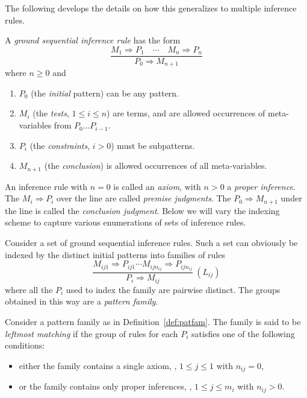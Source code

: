 \documentclass[11pt]{article} %
\begin{document}
The following develops the details on how this generalizes to multiple inference rules.

\begin{definition}
  A \HAX \emph{ground sequential inference rule} has the form
  \begin{equation}
    \dfrac{ M_1 ⇒ P_1 \quad\cdots\quad M_n ⇒ P_n }{ P_0 ⇒ M_{n+1} }
  \end{equation}
  where $n≥0$ and
  \begin{enumerate}
  \item $P_0$ (the \emph{initial} pattern) can be any \HAX pattern.
  \item $M_i$ (the \emph{tests}, $1≤i≤n$) are \HAX terms, and are allowed occurrences of
    meta-variables from $P_0…P_{i-1}$.
  \item $P_i$ (the \emph{constraints}, $i>0$) must be \HAX subpatterns.
  \item $M_{n+1}$ (the \emph{conclusion}) is allowed occurrences of all meta-variables.
  \end{enumerate}
  An inference rule with $n=0$ is called an \emph{axiom}, with $n>0$ a \emph{proper inference}.
  The $M_i⇒P_i$ over the line are called \emph{premise judgments}. The $P_0⇒M_{n+1}$ under the line
  is called the \emph{conclusion judgment}.
  Below we will vary the indexing scheme to capture various enumerations of sets of inference rules.
\end{definition}

\begin{definition}\label{def:patfam}
  Consider a set of ground sequential inference rules.  Such a set can obviously be indexed by the
  distinct initial patterns into families of rules
  \begin{displaymath}
    \dfrac{ M_{ij1} ⇒ P_{ij1} \cdots M_{ijn_{ij}} ⇒ P_{ijn_{ij}} }{ P_i ⇒ M_{ij} } ~(L_{ij})
  \end{displaymath}
  where all the $P_i$ used to index the family are pairwise distinct.  The groups obtained in this
  way are a \emph{pattern family}.
\end{definition}

\begin{definition}
  Consider a pattern family as in Definition~\ref{def:patfam}.  The family is said to be
  \emph{leftmost matching} if the group of rules for each $P_i$ satisfies one of the following
  conditions:
  \begin{itemize}
  \item either the family contains a single axiom, \ie, $1≤j≤1$ with $n_{ij}=0$,
  \item or the family contains only proper inferences, \ie, $1≤j≤m_i$ with $n_{ij}>0$.
  \end{itemize}
\end{definition}
\end{document}
